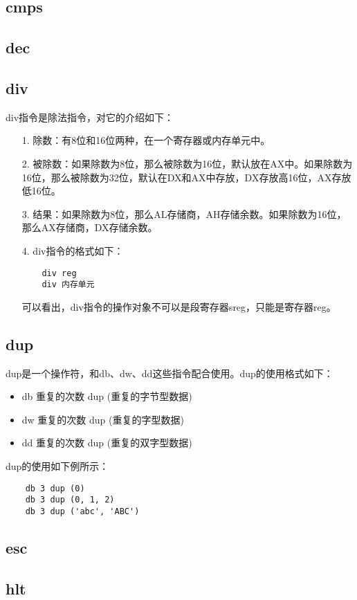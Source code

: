 \documentclass[a4paper,left=2.5cm,right=2.5cm,11pt]{article}
\begin{document}
\subsection{cmps}
\subsection{dec}
\subsection{div}
	div指令是除法指令，对它的介绍如下：
	\begin{itemize}
		\item[1.] 除数：有8位和16位两种，在一个寄存器或内存单元中。
		\item[2.] 被除数：如果除数为8位，那么被除数为16位，默认放在AX中。如果除数为16位，那么被除数为32位，默认在DX和AX中存放，DX存放高16位，AX存放低16位。
		\item[3.] 结果：如果除数为8位，那么AL存储商，AH存储余数。如果除数为16位，那么AX存储商，DX存储余数。
		\item[4.] div指令的格式如下：
		\begin{lstlisting}
	div reg
	div 内存单元
		\end{lstlisting}

		可以看出，div指令的操作对象不可以是段寄存器sreg，只能是寄存器reg。
	\end{itemize}

\subsection{dup}
	dup是一个操作符，和db、dw、dd这些指令配合使用。dup的使用格式如下：
	\begin{itemize}
		\item db 重复的次数 dup (重复的字节型数据)
		\item dw 重复的次数 dup (重复的字型数据)
		\item dd 重复的次数 dup (重复的双字型数据)
	\end{itemize}

	dup的使用如下例所示：
	\begin{lstlisting}
	db 3 dup (0)
	db 3 dup (0, 1, 2)
	db 3 dup ('abc', 'ABC')
	\end{lstlisting}

\subsection{esc}
\subsection{hlt}
\end{document}
